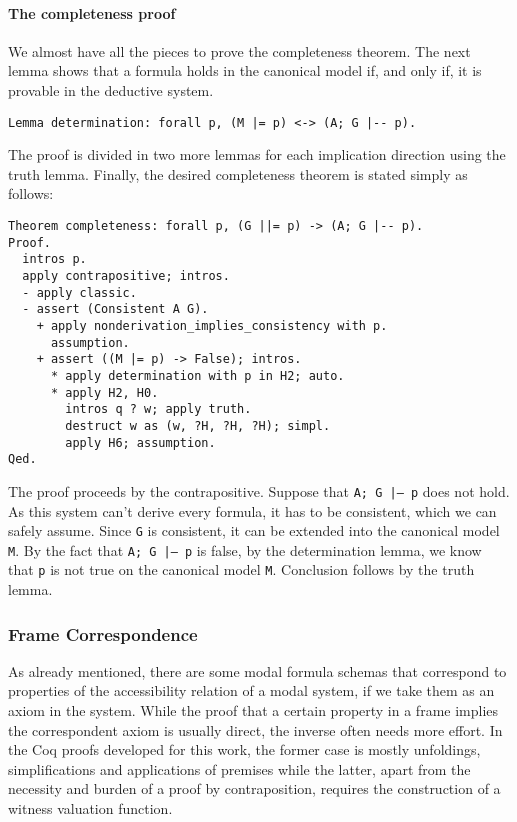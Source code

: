 \documentclass[3p,times]{elsarticle}
\begin{document}
\paragraph{The completeness proof} We almost have all the pieces to prove the completeness theorem. The next lemma
shows that a formula holds in the canonical model if, and only if, it is provable in the deductive system.
\begin{verbatim}
Lemma determination: forall p, (M |= p) <-> (A; G |-- p).
\end{verbatim}
The proof is divided in two more lemmas for each implication direction using the truth lemma. Finally, the desired completeness theorem is stated simply as follows:
\begin{verbatim}
Theorem completeness: forall p, (G ||= p) -> (A; G |-- p).
Proof.
  intros p.
  apply contrapositive; intros.
  - apply classic.
  - assert (Consistent A G).
    + apply nonderivation_implies_consistency with p.
      assumption.
    + assert ((M |= p) -> False); intros.
      * apply determination with p in H2; auto.
      * apply H2, H0.
        intros q ? w; apply truth.
        destruct w as (w, ?H, ?H, ?H); simpl.
        apply H6; assumption.
Qed.
\end{verbatim}
The proof proceeds by the contrapositive.
Suppose that \texttt{A; G |-- p} does not hold.
As this system can't derive every formula, it has to be consistent, which we can safely assume.
Since \verb|G| is consistent, it
can be extended into the canonical model \verb|M|. By the fact that
\texttt{A; G |-- p} is false, by the determination lemma, we know
that \verb|p| is not true on the canonical model \verb|M|. Conclusion follows
by the truth lemma.

\subsubsection{Frame Correspondence}\label{sec:correspondence}

As already mentioned, there are some modal formula schemas that correspond
to properties of the accessibility relation of a modal system, if we take them
as an axiom in the system.  While the proof that a certain property in a frame
implies the correspondent axiom is usually  direct, the inverse often needs
more effort. In the Coq proofs developed for this work,  the former case is
mostly unfoldings, simplifications and applications of premises
while the latter, apart from the necessity and burden of a proof by contraposition,
requires the construction of a witness valuation function.
\end{document}
